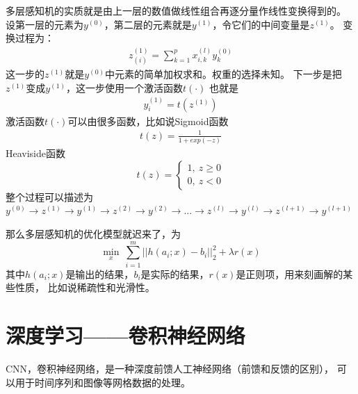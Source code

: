\documentclass{article}
\begin{document}
多层感知机的实质就是由上一层的数值做线性组合再逐分量作线性变换得到的。
设第一层的元素为$y^{(0)}$，第二层的元素就是$y^{(1)}$，令它们的中间变量是$z^{(1)}$。
变换过程为：
\begin{equation}
    \begin{aligned}
  z^{(1)}_{(i)}=\sum_{k=1}^{p}x^{(l)}_{i,k}y^{(0)}_k 
    \end{aligned}
\end{equation}
这一步的$z^{(1)}$就是$y^{(0)}$中元素的简单加权求和。权重的选择未知。
下一步是把$z^{(1)}$变成$y^{(1)}$，这一步使用一个激活函数$t(\cdot)$
也就是
\begin{equation}
    \begin{aligned}
        y^{(1)}_i=t(z^{(1)})
    \end{aligned}
\end{equation}
激活函数$t(\cdot)$可以由很多函数，比如说Sigmoid函数
\begin{equation}
    \begin{aligned}
        t(z)=\frac{1}{1+exp(-z)} 
    \end{aligned}
\end{equation}
Heaviside函数
\begin{equation}
t(z)=\left\{ 
\begin{aligned}
    1,\ z \ge 0 \\ 
    0, \ z < 0 
\end{aligned}
\right.
\end{equation}
整个过程可以描述为
$y^{(0)} \rightarrow z^{(1)} \rightarrow y^{(1)} 
\rightarrow z^{(2)} \rightarrow y^{(2)} 
\rightarrow ... 
\rightarrow z^{(l)} \rightarrow y^{(l)}
\rightarrow z^{(l+1)} \rightarrow y^{(l+1)}$

那么多层感知机的优化模型就迟来了，为
\begin{equation}
    \mathop{min}\limits_x  \ \sum\limits_{i=1}^m ||h(a_i;x)-b_i||^2_2+\lambda r(x)
\end{equation}
其中$h(a_i;x)$是输出的结果，$b_i$是实际的结果，$r(x)$是正则项，用来刻画解的某些性质，
比如说稀疏性和光滑性。
\section{深度学习——卷积神经网络}
CNN，卷积神经网络，是一种深度前馈人工神经网络（前馈和反馈的区别），
可以用于时间序列和图像等网格数据的处理。
\end{document}
